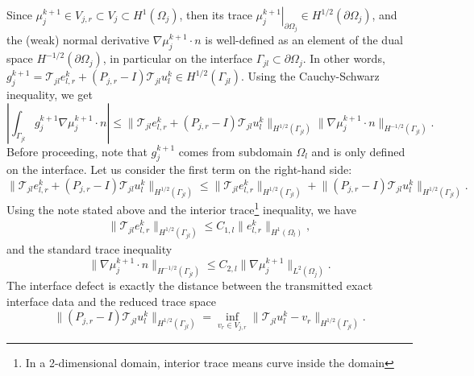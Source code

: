 \documentclass[a4paper, 11pt]{article}
\theoremstyle{plain}
\theoremstyle{definition}
\theoremstyle{remark}
\begin{document}
Since $\mu_{j}^{k+1}\in V_{j, r}\subset V_{j}\subset H^{1}(\Omega_{j})$, then its trace $\left.\mu_{j}^{k+1}\right|_{\partial\Omega_{j}}\in H^{1/2}(\partial\Omega_{j})$, and the (weak) normal derivative $\nabla\mu_{j}^{k+1}\cdot n$ is well-defined as an element of the dual space $H^{-1/2}(\partial\Omega_{j})$, in particular on the interface $\Gamma_{jl}\subset \partial \Omega_{j}$. In other words, $g^{k+1}_{j} = \mathcal{T}_{jl}e_{l, r}^{k} + \left(P_{j, r} -I \right)\mathcal{T}_{jl}u_{l}^{k} \in H^{1/2}(\Gamma_{jl})$. Using the Cauchy-Schwarz inequality, we get
\begin{equation*}
    \left|\int_{\Gamma_{jl}}g^{k+1}_{j}\nabla\mu_{j}^{k+1}\cdot n\right| \leq \lVert \mathcal{T}_{jl}e_{l, r}^{k} + \left(P_{j, r} -I \right)\mathcal{T}_{jl}u_{l}^{k} \rVert_{H^{1/2}(\Gamma_{jl})}\lVert \nabla\mu_{j}^{k+1}\cdot n \rVert_{H^{-1/2}(\Gamma_{jl})}.
\end{equation*}
Before proceeding, note that $g^{k+1}_{j}$ comes from subdomain $\Omega_{l}$ and is only defined on the interface. Let us consider the first term on the right-hand side:
\begin{equation*}
    \lVert \mathcal{T}_{jl}e_{l, r}^{k} + \left(P_{j, r} -I \right)\mathcal{T}_{jl}u_{l}^{k}\rVert_{H^{1/2}(\Gamma_{jl})} \leq \lVert \mathcal{T}_{jl}e_{l, r}^{k}\rVert_{H^{1/2}(\Gamma_{jl})} +  \lVert\left(P_{j, r} -I \right)\mathcal{T}_{jl}u_{l}^{k} \rVert_{H^{1/2}(\Gamma_{jl})}.
\end{equation*}
Using the note stated above and the interior trace\footnote{In a 2-dimensional domain, interior trace means curve inside the domain} inequality, we have
\begin{align*}
     \lVert \mathcal{T}_{jl}e_{l, r}^{k} \rVert_{H^{1/2}(\Gamma_{jl})} \leq C_{1, l} \lVert e_{l, r}^{k}\rVert_{H^{1}(\Omega_{l})},
\end{align*}
and the standard trace inequality
\begin{equation*}
    \lVert \nabla\mu_{j}^{k+1} \cdot n\rVert_{H^{-1/2}(\Gamma_{jl})} \leq C_{2, l}\lVert \nabla\mu_{j}^{k+1} \rVert_{L^{2}(\Omega_{j})}.
\end{equation*}
The interface defect is exactly the distance between the transmitted exact interface data and the reduced trace space
\begin{equation*}
    \lVert \left(P_{j, r} -I \right)\mathcal{T}_{jl}u_{l}^{k} \rVert_{H^{1/2}(\Gamma_{jl})} = \inf_{v_{r}\in V_{j, r}}\lVert \mathcal{T}_{jl}u_{l}^{k} -  v_{r} \rVert_{H^{1/2}(\Gamma_{jl})}.
\end{equation*}
\end{document}
